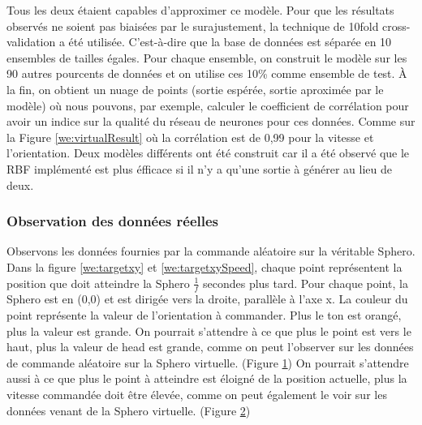 Tous les deux étaient capables d'approximer ce modèle.
Pour que les résultats observés ne soient pas biaisées par le surajustement, la technique de 10fold cross-validation a été utilisée.
C'est-à-dire que la base de données est séparée en 10 ensembles de tailles égales.
Pour chaque ensemble, on construit le modèle sur les 90 autres pourcents de données et on utilise ces 10\% comme ensemble de test.
À la fin, on obtient un nuage de points (sortie espérée, sortie aproximée par le modèle) où nous pouvons, par exemple,
calculer le coefficient de corrélation pour avoir un indice sur la qualité du réseau de neurones pour ces données.
Comme sur la Figure \ref{we:virtualResult} où la corrélation est de 0,99 pour la vitesse et l'orientation.
Deux modèles différents ont été construit car il a été observé que le RBF implémenté est plus éfficace si il n'y a qu'une sortie à générer au lieu de deux.

\subsubsection{Observation des données réelles}
\begin{figure}
 \centering
 \label{we:targetvirtual}
\end{figure}
\begin{figure}
 \centering
 \label{we:targetvirtualSpeed}
\end{figure}

Observons les données fournies par la commande aléatoire sur la véritable Sphero.
Dans la figure \ref{we:targetxy} et \ref{we:targetxySpeed}, chaque point représentent la position que doit atteindre la Sphero $\frac{1}{f}$ secondes plus tard.
Pour chaque point, la Sphero est en (0,0) et est dirigée vers la droite, parallèle à l'axe x.
La couleur du point représente la valeur de l'orientation à commander.
Plus le ton est orangé, plus la valeur est grande.
On pourrait s'attendre à ce que plus le point est vers le haut, plus la valeur de head est grande, comme on peut l'observer sur les données de commande aléatoire sur la Sphero virtuelle. (Figure \ref{we:targetvirtual})
On pourrait s'attendre aussi à ce que plus le point à atteindre est éloigné de la position actuelle, plus la vitesse commandée doit être élevée, comme on peut également le voir sur les données venant de la Sphero virtuelle. (Figure \ref{we:targetvirtualSpeed})

